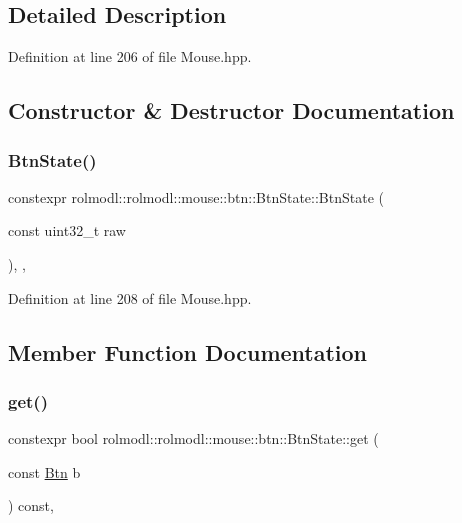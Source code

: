 \subsection{Detailed Description}


Definition at line 206 of file Mouse.\+hpp.



\subsection{Constructor \& Destructor Documentation}
\mbox{\label{structrolmodl_1_1rolmodl_1_1mouse_1_1btn_1_1_btn_state_a4d3185f0d2e974cb44051067c995b3b2}} 
\subsubsection{\texorpdfstring{BtnState()}{BtnState()}}
{\footnotesize\ttfamily constexpr rolmodl\+::rolmodl\+::mouse\+::btn\+::\+Btn\+State\+::\+Btn\+State (\begin{DoxyParamCaption}\item[{const uint32\+\_\+t}]{raw }\end{DoxyParamCaption})\hspace{0.3cm}{\ttfamily [inline]}, {\ttfamily [explicit]}, {\ttfamily [noexcept]}}



Definition at line 208 of file Mouse.\+hpp.



\subsection{Member Function Documentation}
\mbox{\label{structrolmodl_1_1rolmodl_1_1mouse_1_1btn_1_1_btn_state_a5beec883e4525ad7154274d175241571}} 
\subsubsection{\texorpdfstring{get()}{get()}}
{\footnotesize\ttfamily constexpr bool rolmodl\+::rolmodl\+::mouse\+::btn\+::\+Btn\+State\+::get (\begin{DoxyParamCaption}\item[{const \mbox{\hyperlink{namespacerolmodl_1_1rolmodl_1_1mouse_a5ed523191c7ec81f6e69f02b9a616ebf}{Btn}}}]{b }\end{DoxyParamCaption}) const\hspace{0.3cm}{\ttfamily [inline]}, {\ttfamily [noexcept]}}



